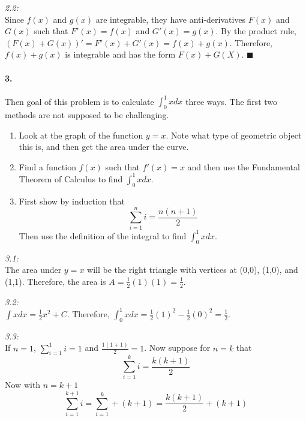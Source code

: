 \documentclass[10pt,a4paper]{article}
\begin{document}
\begin{flushleft}
\textit{2.2:}\\
Since $f(x)$ and $g(x)$ are integrable, they have anti-derivatives $F(x)$ and $G(x)$ such that $F'(x) = f(x)$ and $G'(x) = g(x)$. By the product rule, $(F(x)+G(x))' = F'(x) + G'(x) = f(x) + g(x)$. Therefore, $f(x)+g(x)$ is integrable and has the form $F(x) +G(X)$. $\blacksquare$
\end{flushleft}

\paragraph{3.} Then goal of this problem is to calculate $\int_0^1 xdx$ three ways. The first two methods are not supposed to be challenging.
\begin{enumerate}
\item Look at the graph of the function $y = x$. Note what type of geometric object this is, and then get the area under the curve.
\item Find a function $f(x)$ such that $f'(x) = x$ and then use the Fundamental Theorem of Calculus to find $\int_0^1 xdx$.
\item First show by induction that
$$ \sum_{i=1}^n i = \frac{n(n+1)}{2}$$
Then use the definition of the integral to find $\int_0^1 xdx$.
\end{enumerate}

\begin{flushleft}
\textit{3.1:}\\
The area under $y=x$ will be the right triangle with vertices at (0,0), (1,0), and (1,1). Therefore, the area is $A = \frac{1}{2}(1)(1) = \frac{1}{2}$.
\end{flushleft}

\begin{flushleft}
\textit{3.2:}\\
$\int xdx = \frac{1}{2}x^2 + C$. Therefore, $\int_0^1 xdx = \frac{1}{2}(1)^2 - \frac{1}{2}(0)^2 = \frac{1}{2}$.
\end{flushleft}

\begin{flushleft}
\textit{3.3:}\\
If $n=1$, $\sum_{i=1}^1 i =1$ and $\frac{1(1+1)}{2} = 1$. Now suppose for $n=k$ that
$$ \sum_{i=1}^k i = \frac{k(k+1)}{2}$$
Now with $n=k+1$
$$\sum_{i=1}^{k+1} i = \sum_{i=1}^{k} + (k+1) = \frac{k(k+1)}{2} +(k+1)$$
\end{flushleft}
\end{document}
